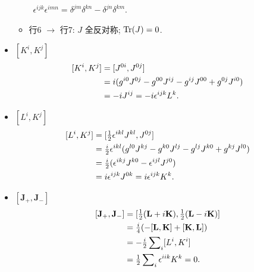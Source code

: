 \begin{itemize}
\begin{itemize}
                \quad \ $\epsilon^{ijk}\epsilon^{imn} = \delta^{jm}\delta^{kn} - \delta^{jn}\delta^{km}$.
          \item 行6 $\rightarrow$ 行7: $J$ 全反对称; $\operatorname{Tr}(J)=0$.
        \end{itemize}
  \item $[K^i, K^j]$
        \begin{equation}
          \begin{aligned}
            \relax[K^i, K^j] & = [J^{0i}, J^{0j}]                                             \\
                             & = i(g^{i0}J^{0j} - g^{00}J^{ij} - g^{ij}J^{00} + g^{0j}J^{i0}) \\
                             & = -iJ^{ij} = -i\epsilon^{ijk}L^k.
          \end{aligned}
        \end{equation}
  \item $[L^i, K^j]$
        \begin{equation}
          \begin{aligned}
            \relax[L^i, K^j] & = [\tfrac{1}{2}\epsilon^{ikl}J^{kl}, J^{0j}]                                            \\
                             & = \tfrac{i}{2}\epsilon^{ikl}(g^{l0}J^{kj} - g^{k0}J^{lj} - g^{lj}J^{k0} + g^{kj}J^{l0}) \\
                             & = \tfrac{i}{2}(\epsilon^{ikj}J^{k0} - \epsilon^{ijl}J^{j0})                             \\
                             & = i\epsilon^{ijk}J^{0k} = i\epsilon^{ijk}K^{k}.
          \end{aligned}
        \end{equation}
  \item $[\mathbf{J}_+, \mathbf{J}_-]$
        \begin{equation}
          \begin{aligned}
            \relax[\mathbf{J}_+, \mathbf{J}_-] & = [\tfrac{1}{2}(\mathbf{L}+i\mathbf{K}), \tfrac{1}{2}(\mathbf{L}-i\mathbf{K})] \\
                                               & = \tfrac{i}{4} (-[\mathbf{L}, \mathbf{K}] + [\mathbf{K}, \mathbf{L}])          \\
                                               & = -\tfrac{i}{2} \sum\nolimits_i [L^i, K^i]                                     \\
                                               & = \tfrac{1}{2}\sum\nolimits_i\epsilon^{iik}K^k = 0.

\end{aligned}
\end{equation}
\end{itemize}
